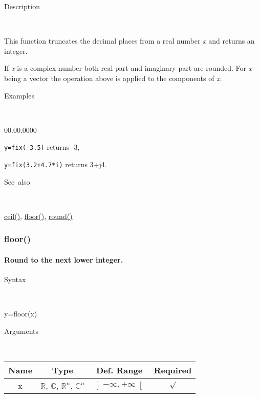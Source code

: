 \begin{description}
\item [Description]~
\end{description}
This function truncates the decimal places from a real number \textit{x}
and returns an integer. 

If \textit{x} is a complex number both real part and imaginary part
are rounded. For \textit{x} being a vector the operation above is
applied to the components of \textit{x}.

\begin{description}
\item [Examples]~
\end{description}
\begin{lyxlist}{00.00.0000}
\item [\texttt{y=fix(-3.5)}]returns -3,
\item [\texttt{y=fix(3.2+4.7{*}i)}]returns 3+j4.
\end{lyxlist}
\begin{description}
\item [See~also]~
\end{description}
\textcolor{blue}{\hyperlink{ceil}{ceil()}}\textcolor{black}{,} \textcolor{blue}{\hyperlink{floor}{floor()}}\textcolor{black}{,}
\textcolor{blue}{\hyperlink{round}{round()}}


\newpage
\subsubsection*{\hypertarget{floor}{}{\Large floor()}}


\paragraph{\label{par:floor}Round to the next lower integer.}

\begin{description}
\item [Syntax]~
\end{description}
y=floor(x)

\begin{description}
\item [Arguments]~
\end{description}
\begin{tabular}{|c|c|c|c|}
\hline 
Name&
Type&
Def. Range&
Required\tabularnewline
\hline
\hline 
x&
$\mathbb{R}$, $\mathbb{C}$, $\mathbb{R}^{n}$, $\mathbb{C}^{n}$&
$\left]-\infty,+\infty\right[$&
$\surd$\tabularnewline
\hline
\end{tabular}

